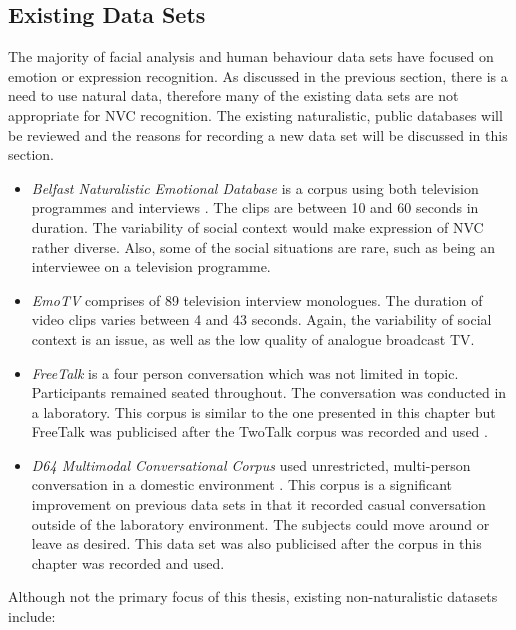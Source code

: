 
\subsection{Existing Data Sets}
\label{SectionExistingDataSets}

The majority of facial analysis and human behaviour data sets have focused on emotion or expression recognition. As discussed in the previous section, there is a need to use natural data, therefore many of the existing data sets are not appropriate for \ac{NVC} recognition. The existing naturalistic, public databases will be reviewed and the reasons for recording a new data set will be discussed in this section.

\begin{itemize}
\item \textit{Belfast Naturalistic Emotional Database} is a corpus using both television programmes and interviews \cite{Cowie2005}. The clips are between 10 and 60 seconds in duration. The variability of social context would make expression of \ac{NVC} rather diverse. Also, some of the social situations are rare, such as being an interviewee on a television programme.
\item \textit{EmoTV} comprises of 89 television interview monologues. The duration of video clips varies between 4 and 43 seconds. Again, the variability of social context is an issue, as well as the low quality of analogue broadcast TV. \cite{Devillers2008}
\item \textit{FreeTalk} is a four person conversation which was not limited in topic. Participants remained seated throughout. The conversation was conducted in a laboratory. This corpus is similar to the one presented in this chapter but FreeTalk was publicised after the TwoTalk corpus was recorded and used \cite{Campbell2010}.
\item \textit{D64 Multimodal Conversational Corpus} used unrestricted, multi-person conversation in a domestic environment \cite{Oertel2010}. This corpus is a significant improvement on previous data sets in that it recorded casual conversation outside of the laboratory environment. The subjects could move around or leave as desired. This data set was also publicised after the corpus in this chapter was recorded and used.
\end{itemize}

Although not the primary focus of this thesis, existing non-naturalistic datasets include:

